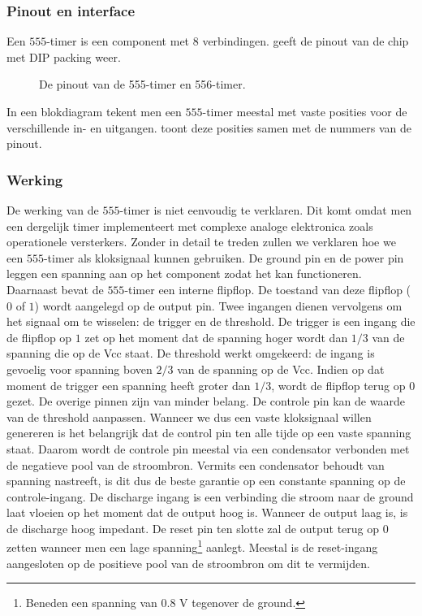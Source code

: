 \subsubsection{Pinout en interface}
Een $555$-timer is een component met $8$ verbindingen.  geeft de pinout van de chip met DIP packing weer.
\begin{figure}[hbt]
\centering
{}
\caption{De pinout van de 555-timer en 556-timer.}
\end{figure}
In een blokdiagram tekent men een $555$-timer meestal met vaste posities voor de verschillende in- en uitgangen.  toont deze posities samen met de nummers van de pinout.
\subsubsection{Werking}
De werking van de $555$-timer is niet eenvoudig te verklaren. Dit komt omdat men een dergelijk timer implementeert met complexe analoge elektronica zoals operationele versterkers. Zonder in detail te treden zullen we verklaren hoe we een $555$-timer als kloksignaal kunnen gebruiken. De ground pin en de power pin leggen een spanning aan op het component zodat het kan functioneren. Daarnaast bevat de $555$-timer een interne flipflop. De toestand van deze flipflop ($0$ of $1$) wordt aangelegd op de output pin. Twee ingangen dienen vervolgens om het signaal om te wisselen: de \mbox{trigger} en de \mbox{threshold}. De \mbox{trigger} is een ingang die de flipflop op $1$ zet op het moment dat de spanning hoger wordt dan $1/3$  van de spanning die op de \mbox{Vcc} staat. De \mbox{threshold} werkt omgekeerd: de ingang is gevoelig voor spanning boven $2/3$ van de spanning op de \mbox{Vcc}. Indien op dat moment de trigger een spanning heeft groter dan $1/3$, wordt de flipflop terug op $0$ gezet. De overige pinnen zijn van minder belang. De controle pin kan de waarde van de threshold aanpassen. Wanneer we dus een vaste kloksignaal willen genereren is het belangrijk dat de control pin ten alle tijde op een vaste spanning staat. Daarom wordt de controle pin meestal via een condensator verbonden met de negatieve pool van de stroombron. Vermits een condensator behoudt van spanning nastreeft, is dit dus de beste garantie op een constante spanning op de controle-ingang. De \mbox{discharge} ingang is een verbinding die stroom naar de ground laat vloeien op het moment dat de \mbox{output} hoog is. Wanneer de \mbox{output} laag is, is de \mbox{discharge} hoog impedant. De \mbox{reset} pin ten slotte zal de output terug op $0$ zetten wanneer men een lage spanning\footnote{Beneden een spanning van $0.8\mbox{ V}$ tegenover de ground.} aanlegt. Meestal is de \mbox{reset}-ingang aangesloten op de positieve pool van de stroombron om dit te vermijden.

